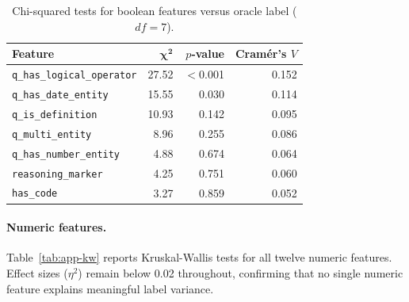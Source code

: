 \begin{table}[H]
\centering
\small
\begin{tabular}{l r r r}
\hline
\textbf{Feature} & $\bm{\chi^2}$ & \textbf{$p$-value} & \textbf{Cram\'er's $V$} \\
\hline
\texttt{q\_has\_logical\_operator} & 27.52 & $<$0.001 & 0.152 \\
\texttt{q\_has\_date\_entity}      & 15.55 & 0.030    & 0.114 \\
\texttt{q\_is\_definition}         & 10.93 & 0.142    & 0.095 \\
\texttt{q\_multi\_entity}          &  8.96 & 0.255    & 0.086 \\
\texttt{q\_has\_number\_entity}    &  4.88 & 0.674    & 0.064 \\
\texttt{reasoning\_marker}         &  4.25 & 0.751    & 0.060 \\
\texttt{has\_code}                 &  3.27 & 0.859    & 0.052 \\
\hline
\end{tabular}
\caption{Chi-squared tests for boolean features versus oracle label ($df = 7$).}
\label{tab:app-chi2}
\end{table}

\paragraph{Numeric features.}
Table~\ref{tab:app-kw} reports Kruskal-Wallis tests for all twelve
numeric features.  Effect sizes ($\eta^2$) remain below 0.02 throughout,
confirming that no single numeric feature explains meaningful label variance.

